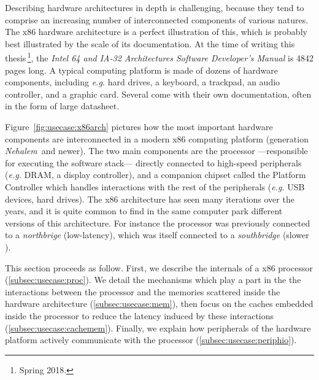 Describing hardware architectures in depth is challenging, because they tend to
comprise an increasing number of interconnected components of various natures.
%
The x86 hardware architecture is a perfect illustration of this, which is
probably best illustrated by the scale of its documentation.
%
At the time of writing this thesis\,\footnote{Spring 2018.}, the \emph{Intel 64
  and IA-32 Architectures Software Developer’s Manual} is 4842 pages long.
%
A typical computing platform is made of dozens of hardware components, including
\emph{e.g.} hard drives, a keyboard, a trackpad, an audio controller, and a
graphic card.
%
Several come with their own documentation, often in the form of large datasheet.

Figure~\ref{fig:usecase:x86arch} pictures how the most important hardware
components are interconnected in a modern x86 computing platform (generation
\emph{Nehalem}\,\cite{thomadakis2011nehalem} and newer).
%
The two main components are the processor ---responsible for executing the
software stack--- directly connected to high-speed peripherals  (\emph{e.g.}  DRAM, a display controller), and a companion chipset
called the Platform Controller which handles interactions with the rest of the
peripherals (\emph{e.g.} USB devices, hard drives).
%
The x86 architecture has seen many iterations over the years, and it is quite
common to find in the same computer park different versions of this architecture.
%
For instance the processor was previously connected to a \emph{northbrige}
(low-latency), which was itself connected to a \emph{southbridge} (slower \IOs).

This section proceeds as follow.
%
First, we describe the internals of a x86 processor (\ref{subsec:usecase:proc}).
%
We detail the mechanisms which play a part in the the interactions between the
processor and the memories scattered inside the hardware architecture
(\ref{subsec:usecase:mem}), then focus on the caches embedded inside the
processor to reduce the latency induced by these interactions
(\ref{subsec:usecase:cachemem}).
%
Finally, we explain how peripherals of the hardware platform actively
communicate with the processor (\ref{subsec:usecase:periphio}).

